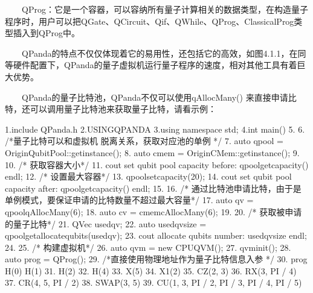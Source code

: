\documentclass[a4paper,11pt,english]{sphinxmanual}
\begin{document}
\sphinxAtStartPar
  QProg：它是一个容器，可以容纳所有量子计算相关的数据类型，在构造量子程序时，用户可以把QGate、QCircuit、Qif、QWhile、QProg、ClassicalProg类型插入到QProg中。

\sphinxAtStartPar
  QPanda的特点不仅仅体现着它的易用性，还包括它的高效，如图4.1.1，在同等硬件配置下，QPanda的量子虚拟机运行量子程序的速度，相对其他工具有着巨大优势。

\sphinxAtStartPar
  QPanda的量子比特池，QPanda不仅可以使用qAllocMany() 来直接申请比特，还可以调用量子比特池来获取量子比特，请看示例：

\begin{sphinxVerbatim}[commandchars=\\\{\}]
1.\PYGZsh{}include \PYGZdq{}QPanda.h\PYGZdq{}
2.USING\PYGZus{}QPANDA
3.using namespace std;
4.int main()
5.\PYGZob{}
6.    /*量子比特可以和虚拟机 脱离关系，获取对应池的单例 */
7.    auto qpool = OriginQubitPool::get\PYGZus{}instance();
8.    auto cmem = OriginCMem::get\PYGZus{}instance();
9.
10.    /* 获取容器大小*/
11.    cout \PYGZlt{}\PYGZlt{} \PYGZdq{}set qubit pool capacity  before: \PYGZdq{}\PYGZlt{}\PYGZlt{} qpool\PYGZhy{}\PYGZgt{}get\PYGZus{}capacity() \PYGZlt{}\PYGZlt{} endl;
12.    /* 设置最大容器*/
13.    qpool\PYGZhy{}\PYGZgt{}set\PYGZus{}capacity(20);
14.    cout \PYGZlt{}\PYGZlt{} \PYGZdq{}set qubit pool capacity  after: \PYGZdq{} \PYGZlt{}\PYGZlt{} qpool\PYGZhy{}\PYGZgt{}get\PYGZus{}capacity() \PYGZlt{}\PYGZlt{} endl;
15.
16.    /* 通过比特池申请比特，由于是单例模式，要保证申请的比特数量不超过最大容量*/
17.    auto qv = qpool\PYGZhy{}\PYGZgt{}qAllocMany(6);
18.    auto cv = cmem\PYGZhy{}\PYGZgt{}cAllocMany(6);
19.
20.    /* 获取被申请的量子比特*/
21.    QVec used\PYGZus{}qv;
22.    auto used\PYGZus{}qv\PYGZus{}size = qpool\PYGZhy{}\PYGZgt{}get\PYGZus{}allocate\PYGZus{}qubits(used\PYGZus{}qv);
23.    cout \PYGZlt{}\PYGZlt{} \PYGZdq{}allocate qubits number: \PYGZdq{} \PYGZlt{}\PYGZlt{} used\PYGZus{}qv\PYGZus{}size \PYGZlt{}\PYGZlt{} endl;
24.
25.    /* 构建虚拟机*/
26.    auto qvm = new CPUQVM();
27.    qvm\PYGZhy{}\PYGZgt{}init();
28.    auto prog = QProg();
29.    /*直接使用物理地址作为量子比特信息入参 */
30.    prog \PYGZlt{}\PYGZlt{} H(0) \PYGZlt{}\PYGZlt{} H(1)
31.        \PYGZlt{}\PYGZlt{} H(2)
32.        \PYGZlt{}\PYGZlt{} H(4)
33.        \PYGZlt{}\PYGZlt{} X(5)
34.        \PYGZlt{}\PYGZlt{} X1(2)
35.        \PYGZlt{}\PYGZlt{} CZ(2, 3)
36.        \PYGZlt{}\PYGZlt{} RX(3, PI / 4)
37.        \PYGZlt{}\PYGZlt{} CR(4, 5, PI / 2)
38.        \PYGZlt{}\PYGZlt{} SWAP(3, 5)
39.        \PYGZlt{}\PYGZlt{} CU(1, 3, PI / 2, PI / 3, PI / 4, PI / 5)

\end{sphinxVerbatim}
\end{document}
